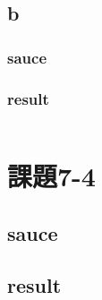 \documentclass[10pt,a4paper]{jsarticle}
\begin{document}
\begin{lstlisting}

\end{lstlisting}

\subsection{b}
\subsubsection{sauce}


\subsubsection{result}
\begin{lstlisting}

\end{lstlisting}

\section{課題7-4}
\subsection{sauce}


\subsection{result}

\begin{lstlisting}
  
\end{lstlisting}
\end{document}
